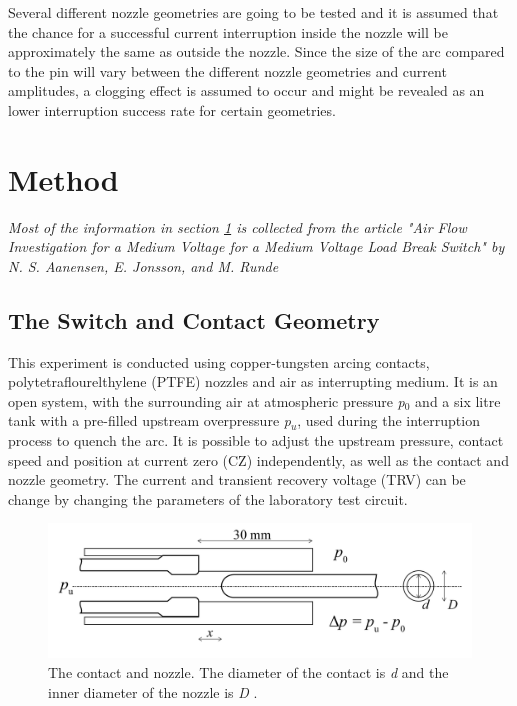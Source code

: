 \documentclass[10pt,a4paper]{article} %
\begin{document}
Several different nozzle geometries are going to be tested and it is assumed that the chance for a successful current interruption inside the nozzle will be approximately the same as outside the nozzle. Since the size of the arc compared to the pin will vary between the different nozzle geometries and current amplitudes, a clogging effect is assumed to occur and might be revealed as an lower interruption success rate for certain geometries.

\newpage
\section{Method} \label{sec:Method}
\textit{ Most of the information in section \ref{sec:Method} is collected from the article "Air Flow Investigation for a Medium Voltage for a Medium Voltage Load Break Switch" by N. S. Aanensen, E. Jonsson, and M. Runde}
\newline

\subsection{The Switch and Contact Geometry}
This experiment is conducted using copper-tungsten arcing contacts, polytetraflourelthylene (PTFE) nozzles and air as interrupting medium. It is an open system, with the surrounding air at atmospheric pressure \textit{p$_0$} and a six litre tank with a pre-filled upstream overpressure \textit{p$_u$}, used during the interruption process to quench the arc. It is possible to adjust the upstream pressure, contact speed and position at current zero (CZ) independently, as well as the contact and nozzle geometry. The current and transient recovery voltage (TRV) can be change by changing the parameters of the laboratory test circuit.

\begin{figure} [h]
\centering
\includegraphics[scale=0.3]{Bilder/Method/contactSetUp.png}
\caption{The contact and nozzle. The diameter of the contact is \textit{d} and the inner diameter of the nozzle is \textit{D}  \cite{bib:AFIMVLBA}.} \label{fig:contactAndNozzle}
\end{figure}
\end{document}
